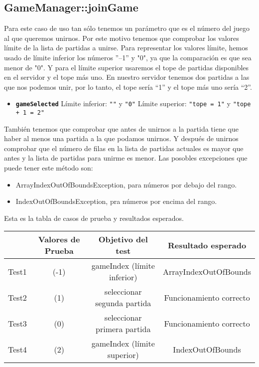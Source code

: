 \subsection{GameManager::joinGame}

Para este caso de uso tan sólo tenemos un parámetro que es el número del juego al que queremos unirnos. Por este motivo tenemos que comprobar los valores límite de la lista de partidas a unirse. Para representar los valores límite, hemos usado de límite inferior los números ''--1'' y "0", ya que la comparación es que sea menor de "0". Y para el límite superior usaremos el tope de partidas disponibles en el servidor y el tope más uno. En nuestro servidor tenemos dos partidas a las que nos podemos unir, por lo tanto, el tope sería ``1'' y el tope más uno sería ``2''. 

\begin{itemize}
\item \textbf{\texttt{gameSelected}}
\subitem Límite inferior: \texttt{""} y \texttt{"0"}
\subitem Límite superior: \texttt{"tope = 1"} y \texttt{"tope + 1 = 2"}
\end{itemize}

También tenemos que comprobar que antes de unirnos a la partida tiene que haber al menos una partida a la que podamos unirnos. Y después de unirnos comprobar que el número de filas en la lista de partidas actuales es mayor que antes y la lista de partidas para unirme es menor.
Las posobles excepciones que puede tener este método son:
\begin{itemize}
\item ArrayIndexOutOfBoundsException, para números por debajo del rango.
\item IndexOutOfBoundsException, pra números por encima del rango.
\end{itemize}

Esta es la tabla de casos de prueba y resultados esperados.

{\footnotesize
\begin{longtable}[c]{lccc}
 & \textbf{Valores de Prueba} & \textbf{Objetivo del test} & \textbf{Resultado esperado} \\
\hline \hline
\endhead

Test1 & (-1) & gameIndex (límite inferior) & ArrayIndexOutOfBounds\\
Test2 & (1) & seleccionar segunda partida & Funcionamiento correcto\\
Test3 & (0) & seleccionar primera partida & Funcionamiento correcto\\
Test4 & (2) & gameIndex (límite superior) & IndexOutOfBounds\\

\hline
\end{longtable}
}

